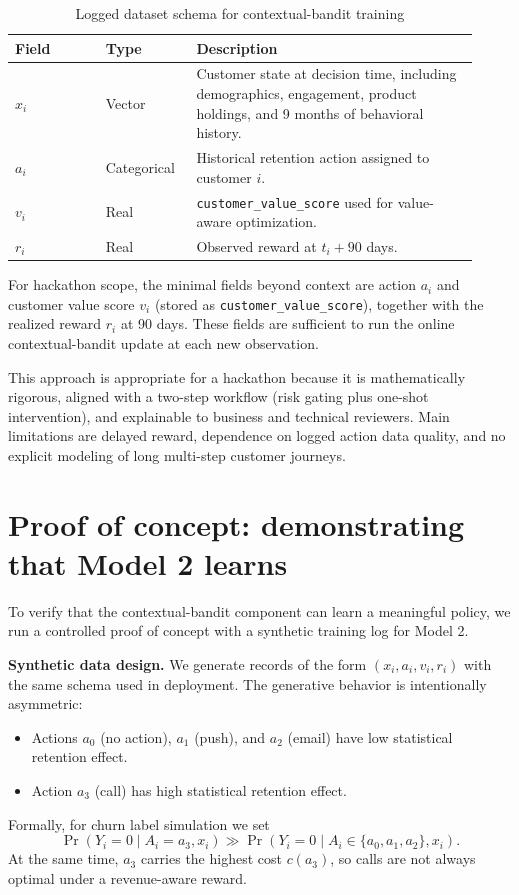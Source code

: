 \documentclass[11pt,a4paper]{article}
\begin{document}
\begin{table}[h]
\centering
\caption{Logged dataset schema for contextual-bandit training}
\begin{tabular}{>{\raggedright\arraybackslash}p{0.18\linewidth} >{\raggedright\arraybackslash}p{0.18\linewidth} >{\raggedright\arraybackslash}p{0.56\linewidth}}
\toprule
Field & Type & Description \\
\midrule
$x_i$ & Vector & Customer state at decision time, including demographics, engagement, product holdings, and 9 months of behavioral history. \\
$a_i$ & Categorical & Historical retention action assigned to customer $i$. \\
$v_i$ & Real & \texttt{customer\_value\_score} used for value-aware optimization. \\
$r_i$ & Real & Observed reward at $t_i+90$ days. \\
\bottomrule
\end{tabular}
\end{table}

For hackathon scope, the minimal fields beyond context are action $a_i$ and customer value score $v_i$ (stored as \texttt{customer\_value\_score}), together with the realized reward $r_i$ at 90 days. These fields are sufficient to run the online contextual-bandit update at each new observation.

This approach is appropriate for a hackathon because it is mathematically rigorous, aligned with a two-step workflow (risk gating plus one-shot intervention), and explainable to business and technical reviewers. Main limitations are delayed reward, dependence on logged action data quality, and no explicit modeling of long multi-step customer journeys.

\section{Proof of concept: demonstrating that Model 2 learns}
To verify that the contextual-bandit component can learn a meaningful policy, we run a controlled proof of concept with a synthetic training log for Model 2.

\textbf{Synthetic data design.} We generate records of the form $(x_i,a_i,v_i,r_i)$ with the same schema used in deployment. The generative behavior is intentionally asymmetric:
\begin{itemize}
    \item Actions $a_0$ (no action), $a_1$ (push), and $a_2$ (email) have low statistical retention effect.
    \item Action $a_3$ (call) has high statistical retention effect.
\end{itemize}
Formally, for churn label simulation we set
\[
\Pr(Y_i=0\mid A_i=a_3, x_i)\gg \Pr(Y_i=0\mid A_i\in\{a_0,a_1,a_2\}, x_i).
\]
At the same time, $a_3$ carries the highest cost $c(a_3)$, so calls are not always optimal under a revenue-aware reward.
\end{document}
